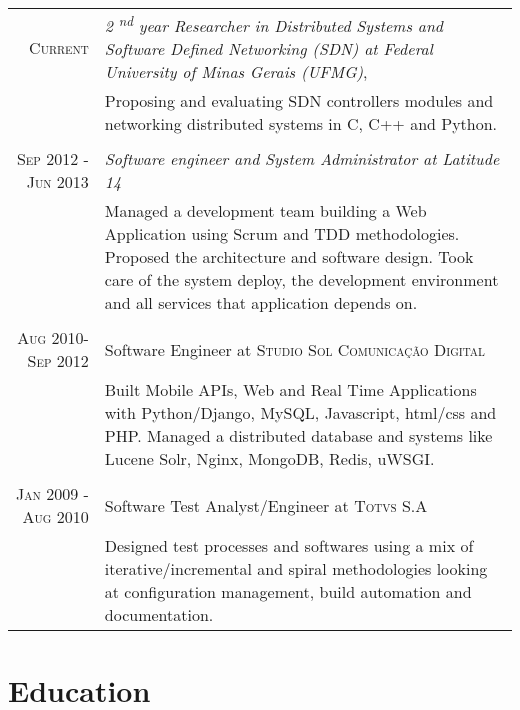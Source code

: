 \documentclass[a4paper,10pt]{article} %
\begin{document}
\begin{tabular}{r|p{11cm}}

\textsc{Current} & \emph{ 2 \textsuperscript{nd} year Researcher in Distributed
Systems and Software Defined Networking (SDN)
at Federal University of Minas Gerais (UFMG)}, \\
& \footnotesize{Proposing and evaluating SDN controllers modules and
networking distributed systems in C, C++ and Python.} \\
\multicolumn{2}{c}{} \\

\textsc{Sep 2012 - Jun 2013} & \emph{Software engineer and System
Administrator at Latitude 14} \\
& \footnotesize{Managed a development team building a Web Application using
Scrum and TDD methodologies.
Proposed the architecture and software design.
Took care of the system deploy, the development environment and all
services that application depends on.} \\
\multicolumn{2}{c}{} \\


\textsc{Aug 2010-Sep 2012} & Software Engineer at \textsc{Studio Sol
Comunicação Digital}  \\
& \footnotesize{Built Mobile APIs, Web and Real Time Applications
with Python/Django, MySQL, Javascript, html/css and PHP.
Managed a distributed database and systems
like Lucene Solr, Nginx, MongoDB, Redis, uWSGI. }\\
\multicolumn{2}{c}{} \\


\textsc{Jan 2009 - Aug 2010} & Software Test Analyst/Engineer
at \textsc{Totvs S.A} \\
& \footnotesize{Designed test processes and softwares using a mix
of iterative/incremental and spiral methodologies looking at
configuration management, build automation and documentation.}
\end{tabular}





\section{Education}
\end{document}
